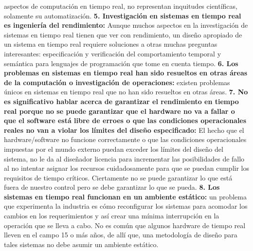 aspectos de computación en tiempo real, no representan inquitudes científicas, solamente su automatización. \textbf{5. Investigación en sistemas en tiempo real es ingeniería del rendimiento:} Aunque muchos aspectos en la investigación de sistemas en tiempo real tienen que ver con rendimiento, un diseño apropiado de un sistema en tiempo real requiere soluciones a otras muchas preguntas interesantes: especificación y verificación del comportamiento temporal y semántica para lenguajes de programación que tome en cuenta tiempo. \textbf{6. Los problemas en sistemas en tiempo real han sido resueltos en otras áreas de la computación o investigación de operaciones:}  existen problemas únicos en sistemas en tiempo real que no han sido resueltos en otras áreas. \textbf{7. No es significativo hablar acerca de garantizar el rendimiento en tiempo real porque no se puede garantizar que el hardware no va a fallar o que el software está libre de erroes o que las condiciones operacionales reales no van a violar los límites del diseño especificado:} El hecho que el hardware/software no funcione correctamente o que las condiciones operacionales  impuestas por el mundo externo puedan exceder los límites del diseño del sistema, no le da al diseñador licencia para incrementar las posibilidades de fallo al no intentar asignar los recursos cuidadosamente para que se puedan cumplir los requisitos de tiempo críticos. Ciertamente no se puede garantizar lo que está fuera de nuestro control pero se debe garantizar lo que se pueda. \textbf{8. Los sistemas en tiempo real funcionan en un ambiente estático:} un problema que experimenta la industria es cómo reconfigurar los sistemas para acomodar los cambios en los requerimientos y así crear una mínima interrupción en la operación que se lleva a cabo. No es común que algunos hardware de tiempo real lleven en el campo 15 o más años, de allí que, una metodología de diseño para tales sistemas no debe asumir un ambiente estático.

